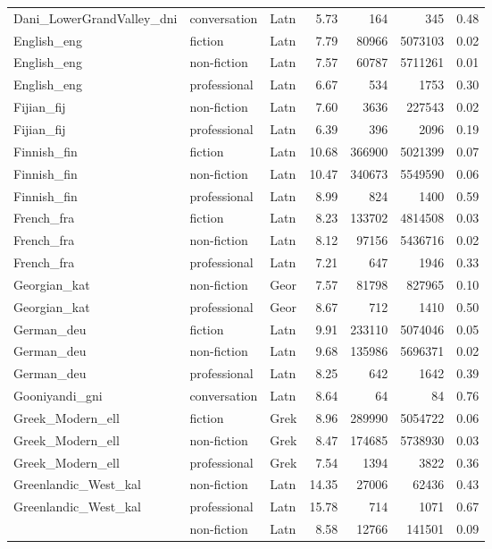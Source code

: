 \begin{longtable}{lllrrrr}
  Dani\_LowerGrandValley\_dni & conversation & Latn & 5.73 & 164 & 345 & 0.48 \\ 
  English\_eng & fiction & Latn & 7.79 & 80966 & 5073103 & 0.02 \\ 
  English\_eng & non-fiction & Latn & 7.57 & 60787 & 5711261 & 0.01 \\ 
  English\_eng & professional & Latn & 6.67 & 534 & 1753 & 0.30 \\ 
  Fijian\_fij & non-fiction & Latn & 7.60 & 3636 & 227543 & 0.02 \\ 
  Fijian\_fij & professional & Latn & 6.39 & 396 & 2096 & 0.19 \\ 
  Finnish\_fin & fiction & Latn & 10.68 & 366900 & 5021399 & 0.07 \\ 
  Finnish\_fin & non-fiction & Latn & 10.47 & 340673 & 5549590 & 0.06 \\ 
  Finnish\_fin & professional & Latn & 8.99 & 824 & 1400 & 0.59 \\ 
  French\_fra & fiction & Latn & 8.23 & 133702 & 4814508 & 0.03 \\ 
  French\_fra & non-fiction & Latn & 8.12 & 97156 & 5436716 & 0.02 \\ 
  French\_fra & professional & Latn & 7.21 & 647 & 1946 & 0.33 \\ 
  Georgian\_kat & non-fiction & Geor & 7.57 & 81798 & 827965 & 0.10 \\ 
  Georgian\_kat & professional & Geor & 8.67 & 712 & 1410 & 0.50 \\ 
  German\_deu & fiction & Latn & 9.91 & 233110 & 5074046 & 0.05 \\ 
  German\_deu & non-fiction & Latn & 9.68 & 135986 & 5696371 & 0.02 \\ 
  German\_deu & professional & Latn & 8.25 & 642 & 1642 & 0.39 \\ 
  Gooniyandi\_gni & conversation & Latn & 8.64 & 64 & 84 & 0.76 \\ 
  Greek\_Modern\_ell & fiction & Grek & 8.96 & 289990 & 5054722 & 0.06 \\ 
  Greek\_Modern\_ell & non-fiction & Grek & 8.47 & 174685 & 5738930 & 0.03 \\ 
  Greek\_Modern\_ell & professional & Grek & 7.54 & 1394 & 3822 & 0.36 \\ 
  Greenlandic\_West\_kal & non-fiction & Latn & 14.35 & 27006 & 62436 & 0.43 \\ 
  Greenlandic\_West\_kal & professional & Latn & 15.78 & 714 & 1071 & 0.67 \\ 
   & non-fiction & Latn & 8.58 & 12766 & 141501 & 0.09 \\ 

\end{longtable}
